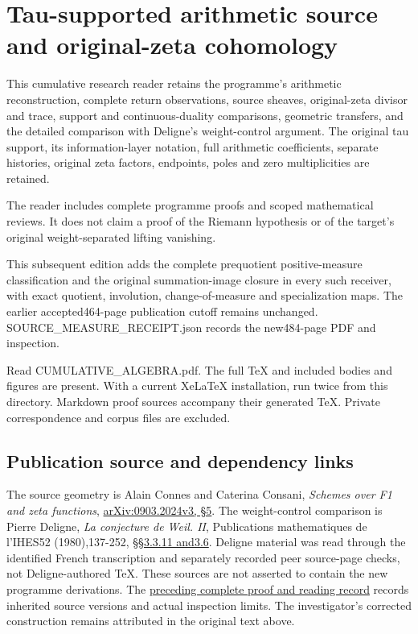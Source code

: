 \chapter{Tau-supported arithmetic source and original-zeta
cohomology}\label{tau-supported-arithmetic-source-and-original-zeta-cohomology}

This cumulative research reader retains the programme's arithmetic
reconstruction, complete return observations, source sheaves,
original-zeta divisor and trace, support and continuous-duality
comparisons, geometric transfers, and the detailed comparison with
Deligne's weight-control argument. The original tau support, its
information-layer notation, full arithmetic coefficients, separate
histories, original zeta factors, endpoints, poles and zero
multiplicities are retained.

The reader includes complete programme proofs and scoped mathematical
reviews. It does not claim a proof of the Riemann hypothesis or of the
target's original weight-separated lifting vanishing.

This subsequent edition adds the complete prequotient positive-measure
classification and the original summation-image closure in every such
receiver, with exact quotient, involution, change-of-measure and
specialization maps. The earlier accepted464-page publication cutoff
remains unchanged. SOURCE\_MEASURE\_RECEIPT.json records the new484-page
PDF and inspection.

Read CUMULATIVE\_ALGEBRA.pdf. The full TeX and included bodies and
figures are present. With a current XeLaTeX installation, run
twice from this directory. Markdown proof sources accompany their
generated TeX. Private correspondence and corpus files are excluded.

\section{Publication source and dependency
links}\label{publication-source-and-dependency-links-8}

The source geometry is Alain Connes and Caterina Consani, \emph{Schemes
over F1 and zeta functions},
\href{https://arxiv.org/abs/0903.2024v3}{arXiv:0903.2024v3, §5}. The
weight-control comparison is Pierre Deligne, \emph{La conjecture de
Weil. II}, Publications mathematiques de l'IHES52 (1980),137-252,
\href{https://www.numdam.org/item/PMIHES_1980__52__137_0/}{§§3.3.11
and3.6}. Deligne material was read through the identified French
transcription and separately recorded peer source-page checks, not
Deligne-authored TeX. These sources are not asserted to contain the new
programme derivations. The
\href{https://github.com/KokunoYumeto/zeta-function-research-reader/blob/36a82ecca98addb8a98b48204e349737856c7223/workbenches/splitzero-tandem/continuations/20260924-cohomology-weight-and-character-lifts/BUILD_AND_REVIEW.md}{preceding
complete proof and reading record} records inherited source versions and
actual inspection limits. The investigator's corrected construction
remains attributed in the original text above.

